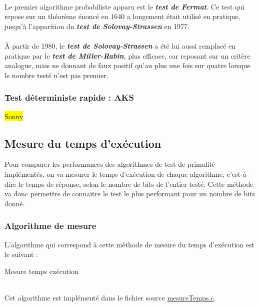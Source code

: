 			\paragraph{}Le premier algorithme probabiliste apparu est le \textit{\textbf{test de Fermat}}. Ce test qui repose sur un théorème énoncé en 1640 a longement était utilisé en pratique, jusqu'à l'apparition du \textit{\textbf{test de Solovay-Strassen}} en 1977. 
			
			\paragraph{} À partir de 1980, le \textit{\textbf{test de Solovay-Strassen}} a été lui aussi remplacé en pratique par le \textit{\textbf{test de Miller-Rabin}}, plus efficace, car reposant sur un critère analogue, mais ne donnant de faux positif qu'au plus une fois sur quatre lorsque le nombre testé n'est pas premier.
			
		\subsubsection*{Test déterministe rapide : AKS}
			\colorbox{yellow}{Sonny}
	
	\subsection{Mesure du temps d'exécution}
		Pour comparer les performances des algorithmes de test de primalité implémentés, on va mesurer le temps d'exécution de chaque algorithme, c'est-à-dire le temps de réponse, selon le nombre de bits de l'entier testé. Cette méthode va donc permettre de connaitre le test le plus performant pour un nombre de bits donné.
		
		\subsubsection*{Algorithme de mesure}
			L'algorithme qui correspond à cette méthode de mesure du temps d'exécution est le suivant :\\
			
			\begin{algorithm}[H]
				\caption{Mesure temps exécution}\label{MEST}
			\end{algorithm}
			~\\
			Cet algorithme est implémenté dans le fichier source \href{run:../../App/src/mesures_performance/mesureTemps.c}{mesureTemps.c}.
			
